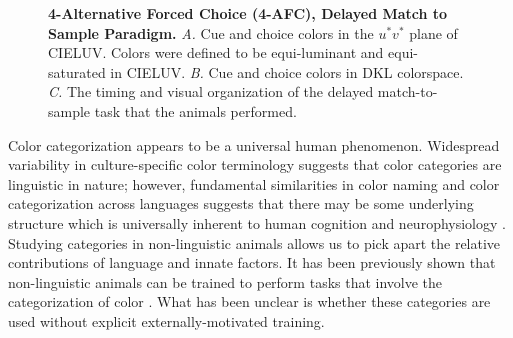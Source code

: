 \begin{figure}
    \centering
    \begin{subfigure}[b]{0.49\textwidth}
         \centering
         \caption{}
         
         \label{fig:epochs}
    \end{subfigure}
    \hfill
    \begin{subfigure}[b]{0.49\textwidth}
         \centering
         \caption{}
         
         \label{fig:StimuliChromaticities}
    \end{subfigure}

    \begin{subfigure}[b]{0.49\textwidth}
         \centering
         \caption{}
         
         \label{fig:Bias1}
    \end{subfigure}
        \hfill
    \begin{subfigure}[b]{0.49\textwidth}
         \centering
         \caption{}
         
         \label{fig:Bias2}
    \end{subfigure}
    \caption{\textbf{4-Alternative Forced Choice (4-AFC), Delayed Match to Sample Paradigm.}
    \emph{A.} Cue and choice colors in the $u^*v^*$ plane of CIELUV. Colors were defined to be equi-luminant and equi-saturated in CIELUV.
    \emph{B.} Cue and choice colors in DKL colorspace.
    \emph{C.} The timing and visual organization of the delayed match-to-sample task that the animals performed.
} 
    \label{fig:ParadigmAnalysisPredictions}
    
\end{figure}

Color categorization appears to be a universal human phenomenon. 
Widespread variability in culture-specific color terminology suggests that color categories are linguistic in nature; however, fundamental similarities in color naming and color categorization across languages suggests that there may be some underlying structure which is universally inherent to human cognition and neurophysiology \citep{berlin_basic_1991,gibson_color_2017}. 
Studying categories in non-linguistic animals allows us to pick apart the relative contributions of language and innate factors. It has been previously shown that non-linguistic animals can be trained to perform tasks that involve the categorization of color \citep{sandell_color_1979,fagot_cross-species_2006}. What has been unclear is whether these categories are used without explicit externally-motivated training.

